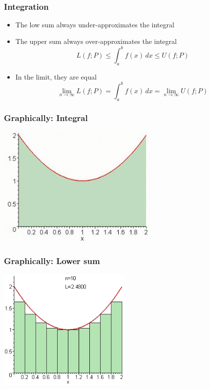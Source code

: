 \documentclass[10pt]{beamer}
\begin{document}
\begin{frame}
\frametitle{Integration}
\begin{itemize}
  \item The low sum always under-approximates the integral
  \item The upper sum always over-approximates the integral
  \begin{equation*}
  L(f;P) \leq \int_{a}^{b} f(x)\,dx \leq U(f;P)
\end{equation*}
  \item In the limit, they are equal
  \begin{equation*}
  \lim_{n\rightarrow\infty} L(f;P) = \int_{a}^{b} f(x)\,dx = \lim_{n\rightarrow\infty} U(f;P)
\end{equation*}
\end{itemize}
\end{frame}
\begin{frame}
\frametitle{Graphically: Integral}
\begin{center}
  \includegraphics[height=6cm]{./figs/integral}
\end{center}
\end{frame}
\begin{frame}
\frametitle{Graphically: Lower sum}
\begin{center}
  \includegraphics[height=6cm]{./figs/lowersum}
\end{center}
\end{frame}
\end{document}

